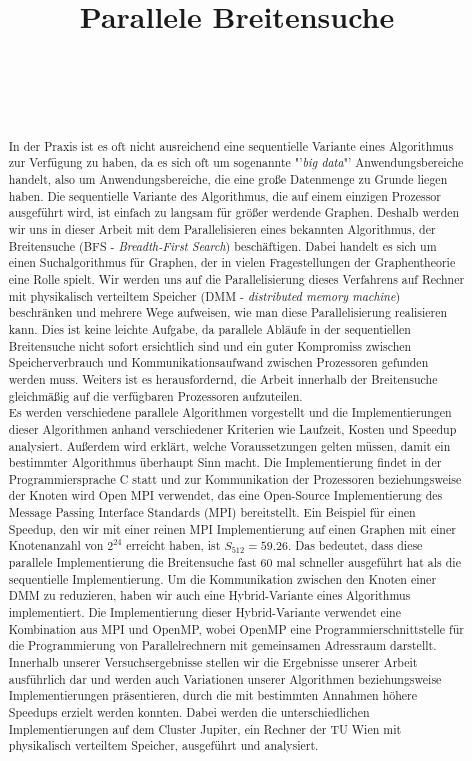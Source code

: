 \documentclass[11pt,a4paper]{article}
\title{Parallele Breitensuche}
\author{
 \authorname{Alexander Gallauner} \\
 \studentnumber{1026090} \\
 \curriculum{534} \\
 \email{alexander.gallauner@gmail.com}
}
\begin{document}
\maketitle
\begin{abstract}
In der Praxis ist es oft nicht ausreichend eine sequentielle Variante eines Algorithmus zur Verfügung zu haben, da es sich oft um sogenannte "'\textit{big data}"' Anwendungsbereiche handelt, also um Anwendungsbereiche, die eine große Datenmenge zu Grunde liegen haben. Die sequentielle Variante des Algorithmus, die auf einem einzigen Prozessor ausgeführt wird, ist einfach zu langsam für größer werdende Graphen. Deshalb werden wir uns in dieser Arbeit mit dem Parallelisieren eines bekannten Algorithmus, der Breitensuche (BFS - \textit{Breadth-First Search}) beschäftigen. Dabei handelt es sich um einen Suchalgorithmus für Graphen, der in vielen Fragestellungen der Graphentheorie eine Rolle spielt. Wir werden uns auf die Parallelisierung dieses Verfahrens auf Rechner mit physikalisch verteiltem Speicher (DMM - \textit{distributed memory machine}) beschränken und mehrere Wege aufweisen, wie man diese Parallelisierung realisieren kann. Dies ist keine leichte Aufgabe, da parallele Abläufe in der sequentiellen Breitensuche nicht sofort ersichtlich sind und ein guter Kompromiss zwischen Speicherverbrauch und Kommunikationsaufwand zwischen Prozessoren gefunden werden muss. Weiters ist es herausfordernd, die Arbeit innerhalb der Breitensuche gleichmäßig auf die verfügbaren Prozessoren aufzuteilen.\\
Es werden verschiedene parallele Algorithmen vorgestellt und die Implementierungen dieser Algorithmen anhand verschiedener Kriterien wie Laufzeit, Kosten und Speedup analysiert. Außerdem wird erklärt, welche Voraussetzungen gelten müssen, damit ein bestimmter Algorithmus überhaupt Sinn macht. Die Implementierung findet in der Programmiersprache C statt und zur Kommunikation der Prozessoren beziehungsweise der Knoten wird Open MPI verwendet, das eine Open-Source Implementierung des Message Passing Interface Standards (MPI) bereitstellt. Ein Beispiel für einen Speedup, den wir mit einer reinen MPI Implementierung auf einen Graphen mit einer Knotenanzahl von \(2^{24}\) erreicht haben, ist \(S_{512} = 59.26\). Das bedeutet, dass diese parallele Implementierung die Breitensuche fast 60 mal schneller ausgeführt hat als die sequentielle Implementierung. Um die Kommunikation zwischen den Knoten einer DMM zu reduzieren, haben wir auch eine Hybrid-Variante eines Algorithmus implementiert. Die Implementierung dieser Hybrid-Variante verwendet eine Kombination aus MPI und OpenMP, wobei OpenMP eine Programmierschnittstelle für die Programmierung von Parallelrechnern mit gemeinsamen Adressraum darstellt. Innerhalb unserer Versuchsergebnisse stellen wir die Ergebnisse unserer Arbeit ausführlich dar und werden auch Variationen unserer Algorithmen beziehungsweise Implementierungen präsentieren, durch die mit bestimmten Annahmen höhere Speedups erzielt werden konnten. Dabei werden die unterschiedlichen Implementierungen auf dem Cluster Jupiter, ein Rechner der TU Wien mit physikalisch verteiltem Speicher, ausgeführt und analysiert.\\

\end{abstract}
\end{document}
